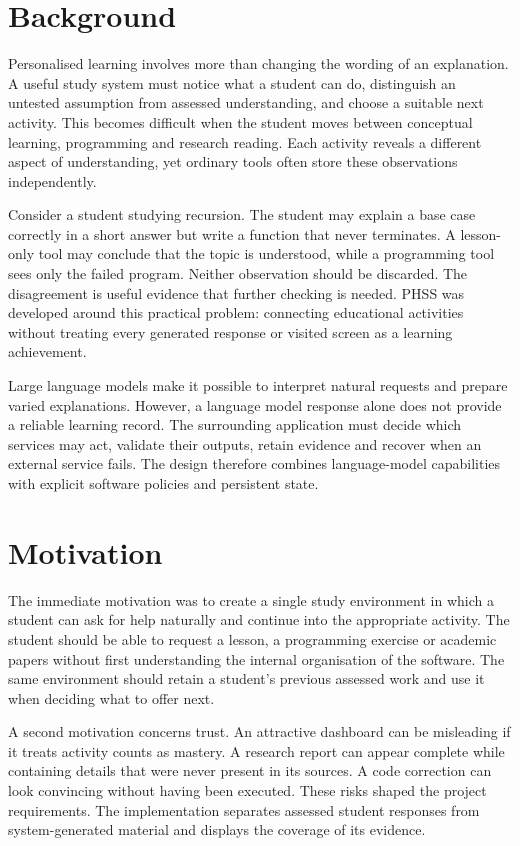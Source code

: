\section{Background}
Personalised learning involves more than changing the wording of an explanation. A useful study system must notice what a student can do, distinguish an untested assumption from assessed understanding, and choose a suitable next activity. This becomes difficult when the student moves between conceptual learning, programming and research reading. Each activity reveals a different aspect of understanding, yet ordinary tools often store these observations independently.

Consider a student studying recursion. The student may explain a base case correctly in a short answer but write a function that never terminates. A lesson-only tool may conclude that the topic is understood, while a programming tool sees only the failed program. Neither observation should be discarded. The disagreement is useful evidence that further checking is needed. PHSS was developed around this practical problem: connecting educational activities without treating every generated response or visited screen as a learning achievement.

Large language models make it possible to interpret natural requests and prepare varied explanations. However, a language model response alone does not provide a reliable learning record. The surrounding application must decide which services may act, validate their outputs, retain evidence and recover when an external service fails. The design therefore combines language-model capabilities with explicit software policies and persistent state.

\section{Motivation}
The immediate motivation was to create a single study environment in which a student can ask for help naturally and continue into the appropriate activity. The student should be able to request a lesson, a programming exercise or academic papers without first understanding the internal organisation of the software. The same environment should retain a student's previous assessed work and use it when deciding what to offer next.

A second motivation concerns trust. An attractive dashboard can be misleading if it treats activity counts as mastery. A research report can appear complete while containing details that were never present in its sources. A code correction can look convincing without having been executed. These risks shaped the project requirements. The implementation separates assessed student responses from system-generated material and displays the coverage of its evidence.

